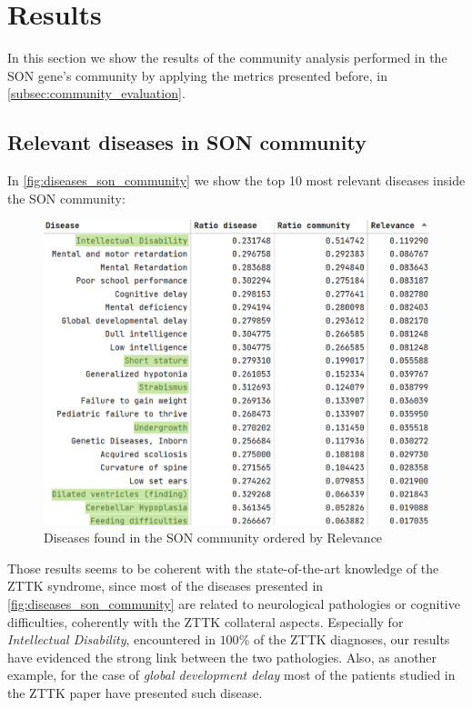 \section{Results}\label{sec:results}
In this section we show the results of the community analysis performed in the SON gene's community by applying the metrics presented before, in \autoref{subsec:community_evaluation}.

\subsection{Relevant diseases in SON community}\label{subsec:relevant_diseases}
In \autoref{fig:diseases_son_community} we show the top 10 most relevant diseases inside the SON community:
\begin{figure}[H]
    \centering
    \includegraphics[width=0.9\linewidth]{images/top20_diseases_connected_highlighted.png}
    \caption{Diseases found in the SON community ordered by Relevance}
    \label{fig:diseases_son_community}
\end{figure}
Those results seems to be coherent with the state-of-the-art knowledge of the ZTTK syndrome, since most of the diseases presented in \autoref{fig:diseases_son_community} are related to neurological pathologies or cognitive difficulties, coherently with the ZTTK collateral aspects. Especially for \textit{Intellectual Disability}, encountered in $100\%$ of the ZTTK diagnoses, our results have evidenced the strong link between the two pathologies. Also, as another example, for the case of \textit{global development delay} most of the patients studied in the ZTTK paper have presented such disease.
\vspace{3mm}

